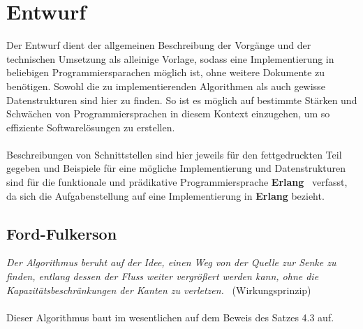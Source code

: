 \documentclass[11pt]{article}
\begin{document}
    \section{Entwurf}
    Der Entwurf dient der allgemeinen Beschreibung der Vorg\"ange und der technischen Umsetzung als alleinige Vorlage, sodass eine Implementierung in beliebigen Programmiersparachen m\"oglich ist, ohne weitere Dokumente zu ben\"otigen. Sowohl die zu implementierenden Algorithmen als auch gewisse Datenstrukturen sind hier zu finden. So ist es m\"oglich auf bestimmte St\"arken und Schw\"achen von Programmiersprachen in diesem Kontext einzugehen, um so effiziente Softwarel\"osungen zu erstellen.\\~\\
    Beschreibungen von Schnittstellen sind hier jeweils f\"ur den fettgedruckten Teil gegeben und Beispiele f\"ur eine m\"ogliche Implementierung und Datenstrukturen sind f\"ur die funktionale und pr\"adikative Programmiersprache \textbf{Erlang}~\cite{erlwikipedia} verfasst, da sich die Aufgabenstellung auf eine Implementierung in \textbf{Erlang} bezieht.

    \subsection{Ford-Fulkerson}
    \textit{Der Algorithmus beruht auf der Idee, einen Weg von der Quelle zur Senke zu finden, entlang dessen der Fluss weiter vergr\"o\ss{}ert werden kann, ohne die Kapazit\"atsbeschr\"ankungen der Kanten zu verletzen.}~\cite{ffwikipedia} (Wirkungsprinzip)\\~\\
    Dieser Algorithmus baut im wesentlichen auf dem Beweis des Satzes 4.3 auf.
\end{document}

